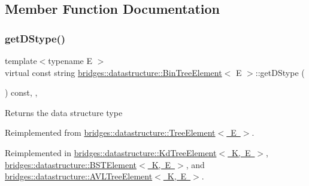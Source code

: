 \subsection{Member Function Documentation}
\mbox{\label{classbridges_1_1datastructure_1_1_bin_tree_element_aef86e3663785972251547e409fdc757b}} 
\subsubsection{\texorpdfstring{get\+D\+Stype()}{getDStype()}}
{\footnotesize\ttfamily template$<$typename E $>$ \\
virtual const string \mbox{\hyperlink{classbridges_1_1datastructure_1_1_bin_tree_element}{bridges\+::datastructure\+::\+Bin\+Tree\+Element}}$<$ E $>$\+::get\+D\+Stype (\begin{DoxyParamCaption}{ }\end{DoxyParamCaption}) const\hspace{0.3cm}{\ttfamily [inline]}, {\ttfamily [override]}, {\ttfamily [virtual]}}

\begin{DoxyReturn}{Returns}
the data structure type 
\end{DoxyReturn}


Reimplemented from \mbox{\hyperlink{classbridges_1_1datastructure_1_1_tree_element_a897f34ea284da45e1dc869c3e3b6c9a4}{bridges\+::datastructure\+::\+Tree\+Element$<$ E $>$}}.



Reimplemented in \mbox{\hyperlink{classbridges_1_1datastructure_1_1_kd_tree_element_a76f6d9bfadfdec09d0a8564aa0e33235}{bridges\+::datastructure\+::\+Kd\+Tree\+Element$<$ K, E $>$}}, \mbox{\hyperlink{classbridges_1_1datastructure_1_1_b_s_t_element_a2bb8cc9ec4b6bc5b89ecef0f17be366f}{bridges\+::datastructure\+::\+B\+S\+T\+Element$<$ K, E $>$}}, and \mbox{\hyperlink{classbridges_1_1datastructure_1_1_a_v_l_tree_element_ab04d1e9ad4630e408041e8137dc9854a}{bridges\+::datastructure\+::\+A\+V\+L\+Tree\+Element$<$ K, E $>$}}.

\mbox{\label{classbridges_1_1datastructure_1_1_bin_tree_element_ab30cfe373892c52709d5f1df013a0c82}} 
